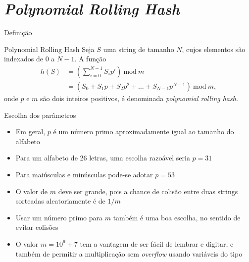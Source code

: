 \section{{\it Polynomial Rolling Hash}}

\begin{frame}[fragile]{Definição}

    \begin{block}{Polynomial Rolling Hash}
    Seja $S$ uma string de tamanho $N$, cujos elementos são indexados de 0 a $N - 1$. A função 
    \begin{align*}
        h(S) &= \left(\sum_{i=0}^{N - 1} S_ip^i\right)\ \mbox{mod}\ m \\
        &= \left(S_0 + S_1p + S_2p^2 + \ldots + S_{N-1}p^{N-1}\right)\ \mbox{mod}\ m,
    \end{align*}
    onde $p$ e $m$ são dois inteiros positivos, é denominada \textit{polynomial rolling hash}.
    \end{block}

\end{frame}

\begin{frame}[fragile]{Escolha dos parâmetros}

    \begin{itemize}
        \item Em geral, $p$ é um número primo aproximadamente igual ao tamanho do alfabeto
        \item Para um alfabeto de 26 letras, uma escolha razoável seria $p = 31$
        \item Para maiúsculas e minúsculas pode-se adotar $p = 53$
        \item O valor de $m$ deve ser grande, pois a chance de colisão entre duas strings
            sorteadas aleatoriamente é de $1/m$
        \item Usar um número primo para $m$ também é uma boa escolha, no sentido de evitar 
            colisões

        \item O valor $m = 10^9 + 7$ tem a vantagem de ser fácil de lembrar e digitar, e também
            de permitir a multiplicação sem \textit{overflow} usando variáveis do tipo
    \end{itemize}

\end{frame}


